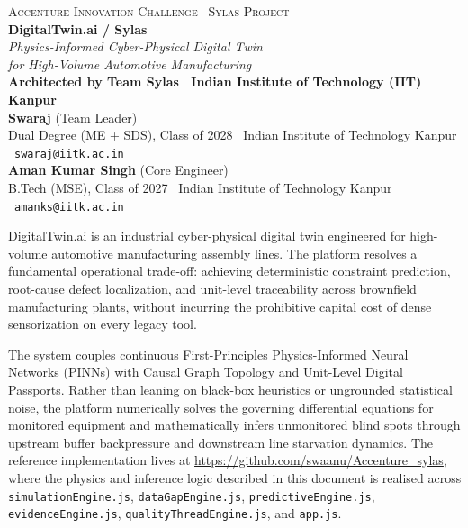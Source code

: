 \documentclass[11pt]{article}
\begin{document}
\begin{titlepage}
\centering
\vspace*{0.5cm}
{\small\textsc{Accenture Innovation Challenge \textbullet\ Sylas Project}}\\[1.0cm]

{\Huge\bfseries\color{sylasblue} DigitalTwin.ai / Sylas}\\[0.5cm]
{\Large\itshape Physics-Informed Cyber-Physical Digital Twin\\ for High-Volume Automotive Manufacturing}\\[0.8cm]

{\textbf{Architected by Team Sylas \textbullet\ Indian Institute of Technology (IIT) Kanpur}}\\[0.25cm]
{\large\textbf{Swaraj}} (Team Leader) \\
{\small Dual Degree (ME + SDS), Class of 2028 \textbullet\ Indian Institute of Technology Kanpur \textbullet\ \texttt{swaraj@iitk.ac.in}}\\[0.15cm]
{\large\textbf{Aman Kumar Singh}} (Core Engineer) \\
{\small B.Tech (MSE), Class of 2027 \textbullet\ Indian Institute of Technology Kanpur \textbullet\ \texttt{amanks@iitk.ac.in}}\\[0.8cm]

\begin{minipage}{0.88\textwidth}
\centering\small
DigitalTwin.ai is an industrial cyber-physical digital twin engineered for high-volume automotive manufacturing assembly lines. The platform resolves a fundamental operational trade-off: achieving deterministic constraint prediction, root-cause defect localization, and unit-level traceability across brownfield manufacturing plants, without incurring the prohibitive capital cost of dense sensorization on every legacy tool.

\vspace{0.3cm}
The system couples continuous First-Principles Physics-Informed Neural Networks (PINNs) with Causal Graph Topology and Unit-Level Digital Passports. Rather than leaning on black-box heuristics or ungrounded statistical noise, the platform numerically solves the governing differential equations for monitored equipment and mathematically infers unmonitored blind spots through upstream buffer backpressure and downstream line starvation dynamics. The reference implementation lives at \url{https://github.com/swaanu/Accenture_sylas}, where the physics and inference logic described in this document is realised across \texttt{simulationEngine.js}, \texttt{dataGapEngine.js}, \texttt{predictiveEngine.js}, \texttt{evidenceEngine.js}, \texttt{qualityThreadEngine.js}, and \texttt{app.js}.
\end{minipage}


\end{titlepage}
\end{document}
